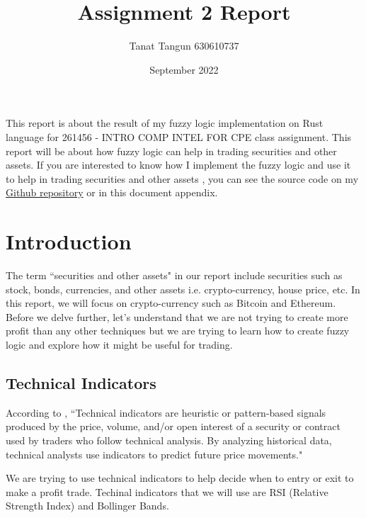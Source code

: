 \documentclass{article}
\title{Assignment 2 Report}
\author{Tanat Tangun 630610737}
\date{September 2022}
\begin{document}
\maketitle
This report is about the result of my fuzzy logic implementation on Rust language for 261456 - INTRO COMP INTEL FOR CPE class
assignment. This report will be about how fuzzy logic can help in trading securities and other assets. 
If you are interested to know how I implement the fuzzy logic and use it to help in trading securities and other assets
, you can see the source code on my 
\href{https://github.com/RiwEZ/MLPOnRust}{Github repository} or in this document appendix.

\section*{Introduction}
The term ``securities and other assets" in our report include securities such as stock, bonds, currencies, and other assets
i.e. crypto-currency, house price, etc. In this report, we will focus on crypto-currency such as Bitcoin and Ethereum. Before we delve 
further, let's understand that we are not trying to create more profit than any other techniques but we are trying to learn how
to create fuzzy logic and explore how it might be useful for trading.

\subsection*{Technical Indicators}
According to \cite{technical_indicator}, ``Technical indicators are heuristic or pattern-based signals produced by the price, volume, 
and/or open interest of a security or contract used by traders who follow technical analysis.
By analyzing historical data, technical analysts use indicators to predict future price movements."

We are trying to use technical indicators to help decide when to entry or exit to make a profit trade. Techinal indicators
that we will use are RSI (Relative Strength Index) and Bollinger Bands.
\end{document}
